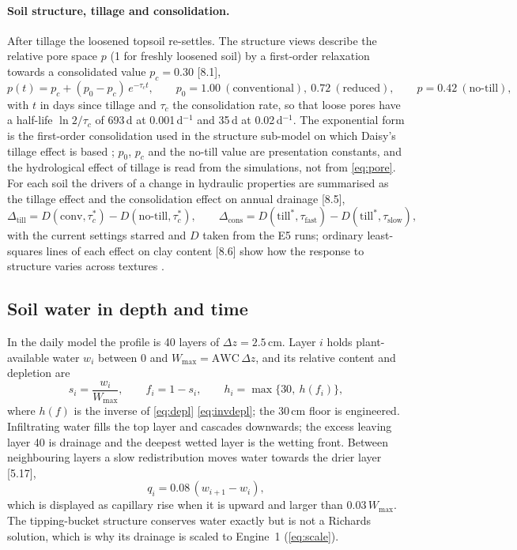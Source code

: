 \documentclass[preprint,12pt]{elsarticle}
\begin{document}
\paragraph{Soil structure, tillage and consolidation.}
\label{sec:sys-structure}
After tillage the loosened topsoil re-settles. The structure views describe the relative pore space $p$ (1 for freshly loosened soil) by a first-order relaxation towards a consolidated value $p_c=0.30$ [8.1],
\begin{equation}
p(t)=p_c+(p_0-p_c)\,e^{-\tau_ct},\qquad p_0=1.00\ (\text{conventional}),\ 0.72\ (\text{reduced}),\qquad p=0.42\ (\text{no-till}),
\label{eq:pore}
\end{equation}
with $t$ in days since tillage and $\tau_c$ the consolidation rate, so that loose pores have a half-life $\ln2/\tau_c$ of 693\,d at 0.001\,d$^{-1}$ and 35\,d at 0.02\,d$^{-1}$. The exponential form is the first-order consolidation used in the structure sub-model on which Daisy's tillage effect is based \cite{Flanagan1995}; $p_0$, $p_c$ and the no-till value are presentation constants, and the hydrological effect of tillage is read from the simulations, not from \cref{eq:pore}. For each soil the drivers of a change in hydraulic properties are summarised as the tillage effect and the consolidation effect on annual drainage [8.5],
\begin{equation}
\Delta_{\mathrm{till}}=D(\mathrm{conv},\tau_c^\ast)-D(\mathrm{no\text{-}till},\tau_c^\ast),\qquad \Delta_{\mathrm{cons}}=D(\mathrm{till}^\ast,\tau_{\mathrm{fast}})-D(\mathrm{till}^\ast,\tau_{\mathrm{slow}}),
\label{eq:drivers}
\end{equation}
with the current settings starred and $D$ taken from the E5 runs; ordinary least-squares lines of each effect on clay content [8.6] show how the response to structure varies across textures \cite{Strudley2008,Leuther2021}.

\subsection{Soil water in depth and time}
\label{sec:sys-water}
In the daily model the profile is 40 layers of $\Delta z=2.5$\,cm. Layer $i$ holds plant-available water $w_i$ between 0 and $W_{\max}=\mathrm{AWC}\,\Delta z$, and its relative content and depletion are
\begin{equation}
s_i=\frac{w_i}{W_{\max}},\qquad f_i=1-s_i,\qquad h_i=\max\{30,\ h(f_i)\},
\label{eq:layer}
\end{equation}
where $h(f)$ is the inverse of \cref{eq:depl} \cref{eq:invdepl}; the 30\,cm floor is engineered. Infiltrating water fills the top layer and cascades downwards; the excess leaving layer 40 is drainage and the deepest wetted layer is the wetting front. Between neighbouring layers a slow redistribution moves water towards the drier layer [5.17],
\begin{equation}
q_i=0.08\,(w_{i+1}-w_i),
\label{eq:redis}
\end{equation}
which is displayed as capillary rise when it is upward and larger than $0.03\,W_{\max}$. The tipping-bucket structure conserves water exactly but is not a Richards solution, which is why its drainage is scaled to Engine~1 (\cref{eq:scale}).
\end{document}
